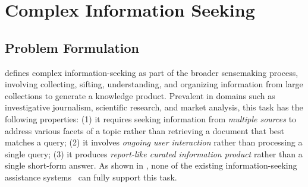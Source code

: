 \documentclass[11pt]{article}
\begin{document}
\section{Complex Information Seeking}



\subsection{Problem Formulation}
\label{sec:task_setup}

\citet{pirolli2009powers} defines complex information-seeking as part of the broader sensemaking process, involving collecting, sifting, understanding, and organizing information from large collections to generate a knowledge product. Prevalent in domains such as investigative journalism, scientific research, and market analysis, this task has the following properties: (1) it requires seeking information from \textit{multiple sources} to address various facets of a topic rather than retrieving a document that best matches a query; (2) it involves \textit{ongoing user interaction} rather than processing a single query; (3) it produces \textit{report-like curated information product} rather than a single short-form answer. As shown in , %
none of the existing information-seeking assistance systems~\citep[e.g.,][]{Robertson1977THEORIESAM,chen-etal-2017-reading,reddy-etal-2019-coqa,shao2024assisting} can  fully support this task.
\end{document}
